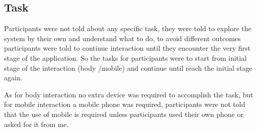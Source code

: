 \subsection{Task}
Participants were not told about any specific task, they were told to explore the system by their own and understand what to do, to avoid different outcomes participants were told to continue interaction until they encounter the very first stage of the application. So the tasks for participants were to start from initial stage of the interaction (body /mobile) and continue until reach the initial stage again.

As for body interaction no extra device was required to accomplish the task, but for mobile interaction a mobile phone was required, participants were not told that the use of mobile is required unless participants used their own phone or asked for it from me.

